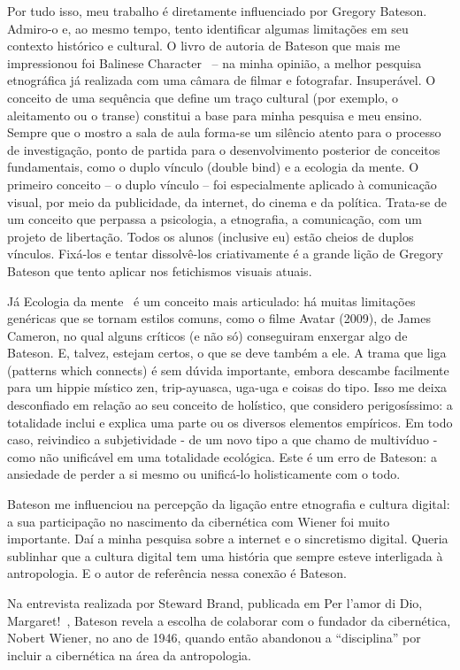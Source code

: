 \documentclass[a4paper, 12pt]{article} %
\begin{document}
Por tudo isso, meu trabalho é diretamente influenciado por Gregory Bateson. Admiro-o e, ao mesmo tempo, tento identificar algumas limitações em seu contexto histórico e cultural. O livro de autoria de Bateson que mais me impressionou foi Balinese Character~\cite{b4} – na minha opinião, a melhor pesquisa etnográfica já realizada com uma câmara de filmar e fotografar. Insuperável. O conceito de uma sequência que define um traço cultural (por exemplo, o aleitamento ou o transe) constitui a base para minha pesquisa e meu ensino. Sempre que o mostro a sala de aula forma-se um silêncio atento para o processo de investigação, ponto de partida para o desenvolvimento posterior de conceitos fundamentais, como o duplo vínculo (double bind) e a ecologia da mente. O primeiro conceito – o duplo vínculo – foi especialmente aplicado à comunicação visual, por meio da publicidade, da internet, do cinema e da política. Trata-se de um conceito que perpassa a psicologia, a etnografia, a comunicação, com um projeto de libertação. Todos os alunos (inclusive eu) estão cheios de duplos vínculos. Fixá-los e tentar dissolvê-los criativamente é a grande lição de Gregory Bateson que tento aplicar nos fetichismos visuais atuais. 

Já Ecologia da mente~\cite{b5} é um conceito mais articulado: há muitas limitações genéricas que se tornam estilos comuns, como o filme Avatar (2009), de James Cameron, no qual alguns críticos (e não só) conseguiram enxergar algo de Bateson. E, talvez, estejam certos, o que se deve também a ele. A trama que liga (patterns which connects) é sem dúvida importante, embora descambe facilmente para um hippie místico zen, trip-ayuasca, uga-uga e coisas do tipo. Isso me deixa desconfiado em relação ao seu conceito de holístico, que considero perigosíssimo: a totalidade inclui e explica uma parte ou os diversos elementos empíricos. Em todo caso, reivindico a subjetividade - de um novo tipo a que chamo de multivíduo -  como não unificável em uma totalidade ecológica. Este é um erro de Bateson: a ansiedade de perder a si mesmo ou unificá-lo holisticamente com o todo. 

Bateson me influenciou na percepção da ligação entre etnografia e cultura digital: a sua participação no nascimento da cibernética com Wiener foi muito importante. Daí a minha pesquisa sobre a internet e o sincretismo digital. Queria sublinhar que a cultura digital tem uma história que sempre esteve interligada à antropologia. E o autor de referência nessa conexão é Bateson. 

Na entrevista realizada por Steward Brand, publicada em Per l’amor di Dio, Margaret!~\cite{b6}, Bateson revela a escolha de colaborar com o fundador da cibernética, Nobert Wiener, no ano de 1946, quando então abandonou a “disciplina” por incluir a cibernética na área da antropologia. 
\end{document}
